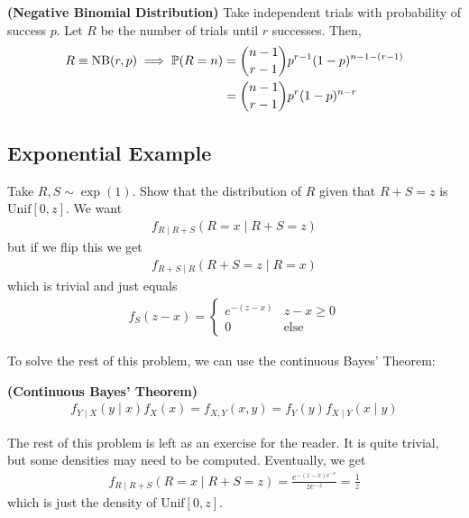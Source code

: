 \begin{definition}
    \textbf{(Negative Binomial Distribution)} Take independent trials with probability of success $p$. Let $R$ be the number of trials until $r$ successes. Then,
    \begin{align}
        R \equiv \text{NB}(r,p) \implies \mathbb{P}(R = n) &= \binom{n-1}{r-1} p^{r-1} (1-p)^{n-1-(r-1)}\\
        &= \binom{n-1}{r-1}p^r(1-p)^{n-r}
    \end{align}
\end{definition}

\subsection{Exponential Example}
Take $R,S \sim \exp(1)$. Show that the distribution of $R$ given that $R + S = z$ is $\text{Unif}[0,z]$. We want
\begin{align}
    f_{R \mid R + S}(R = x \mid R + S = z)
\end{align}
but if we flip this we get
\begin{align}
    f_{R + S \mid R}(R + S = z \mid R = x)
\end{align}
which is trivial and just equals
\begin{align}
    f_S(z - x) = \begin{cases}
        e^{-(z-x)} & z-x \ge 0\\
        0 & \text{else}
    \end{cases}
\end{align}

To solve the rest of this problem, we can use the continuous Bayes' Theorem:
\begin{proposition}
    \textbf{(Continuous Bayes' Theorem)}
    \begin{align}
        f_{Y \mid X}(y \mid x) f_X(x) = f_{X,Y}(x,y) = f_Y(y)f_{X \mid Y}(x \mid y)
    \end{align}
\end{proposition}

The rest of this problem is left as an exercise for the reader. It is quite trivial, but some densities may need to be computed. Eventually, we get
\begin{align}
    f_{R \mid R + S}(R = x \mid R + S = z) = \frac{e^{-(z-x)e^{-x}}}{ze^{-z}} = \frac{1}{z}
\end{align}
which is just the density of $\text{Unif}[0,z]$.

